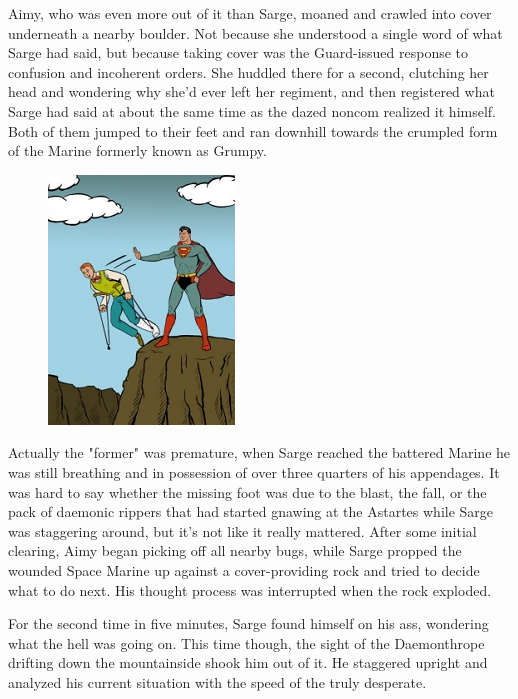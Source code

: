

Aimy, who was even more out of it than Sarge, moaned and crawled into cover underneath a nearby boulder. 
Not because she understood a single word of what Sarge had said, but because taking cover was the Guard-issued response to confusion and incoherent orders. 
She huddled there for a second, clutching her head and wondering why she'd ever left her regiment, and then registered what Sarge had said at about the same time as the dazed noncom realized it himself. 
Both of them jumped to their feet and ran downhill towards the crumpled form of the Marine formerly known as Grumpy.

\begin{figure}
	\begin{center}
		\includegraphics[width=\figwidth]{pics/16/50.png}
	\end{center}
\end{figure}
Actually the "former" was premature, when Sarge reached the battered Marine he was still breathing and in possession of over three quarters of his appendages. 
It was hard to say whether the missing foot was due to the blast, the fall, or the pack of daemonic rippers that had started gnawing at the Astartes while Sarge was staggering around, but it's not like it really mattered. 
After some initial clearing, Aimy began picking off all nearby bugs, while Sarge propped the wounded Space Marine up against a cover-providing rock and tried to decide what to do next. 
His thought process was interrupted when the rock exploded.

For the second time in five minutes, Sarge found himself on his ass, wondering what the hell was going on. 
This time though, the sight of the Daemonthrope drifting down the mountainside shook him out of it. 
He staggered upright and analyzed his current situation with the speed of the truly desperate. 


